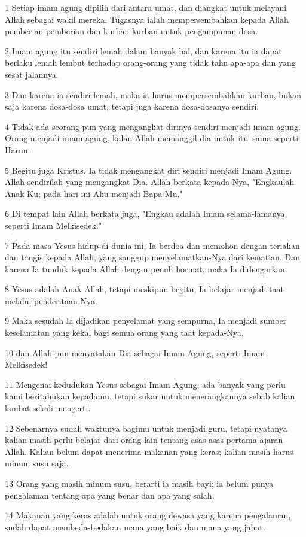 \par 1 Setiap imam agung dipilih dari antara umat, dan diangkat untuk melayani Allah sebagai wakil mereka. Tugasnya ialah mempersembahkan kepada Allah pemberian-pemberian dan kurban-kurban untuk pengampunan dosa.
\par 2 Imam agung itu sendiri lemah dalam banyak hal, dan karena itu ia dapat berlaku lemah lembut terhadap orang-orang yang tidak tahu apa-apa dan yang sesat jalannya.
\par 3 Dan karena ia sendiri lemah, maka ia harus mempersembahkan kurban, bukan saja karena dosa-dosa umat, tetapi juga karena dosa-dosanya sendiri.
\par 4 Tidak ada seorang pun yang mengangkat dirinya sendiri menjadi imam agung. Orang menjadi imam agung, kalau Allah memanggil dia untuk itu--sama seperti Harun.
\par 5 Begitu juga Kristus. Ia tidak mengangkat diri sendiri menjadi Imam Agung. Allah sendirilah yang mengangkat Dia. Allah berkata kepada-Nya, "Engkaulah Anak-Ku; pada hari ini Aku menjadi Bapa-Mu."
\par 6 Di tempat lain Allah berkata juga, "Engkau adalah Imam selama-lamanya, seperti Imam Melkisedek."
\par 7 Pada masa Yesus hidup di dunia ini, Ia berdoa dan memohon dengan teriakan dan tangis kepada Allah, yang sanggup menyelamatkan-Nya dari kematian. Dan karena Ia tunduk kepada Allah dengan penuh hormat, maka Ia didengarkan.
\par 8 Yesus adalah Anak Allah, tetapi meskipun begitu, Ia belajar menjadi taat melalui penderitaan-Nya.
\par 9 Maka sesudah Ia dijadikan penyelamat yang sempurna, Ia menjadi sumber keselamatan yang kekal bagi semua orang yang taat kepada-Nya,
\par 10 dan Allah pun menyatakan Dia sebagai Imam Agung, seperti Imam Melkisedek!
\par 11 Mengenai kedudukan Yesus sebagai Imam Agung, ada banyak yang perlu kami beritahukan kepadamu, tetapi sukar untuk menerangkannya sebab kalian lambat sekali mengerti.
\par 12 Sebenarnya sudah waktunya bagimu untuk menjadi guru, tetapi nyatanya kalian masih perlu belajar dari orang lain tentang asas-asas pertama ajaran Allah. Kalian belum dapat menerima makanan yang keras; kalian masih harus minum susu saja.
\par 13 Orang yang masih minum susu, berarti ia masih bayi; ia belum punya pengalaman tentang apa yang benar dan apa yang salah.
\par 14 Makanan yang keras adalah untuk orang dewasa yang karena pengalaman, sudah dapat membeda-bedakan mana yang baik dan mana yang jahat.

